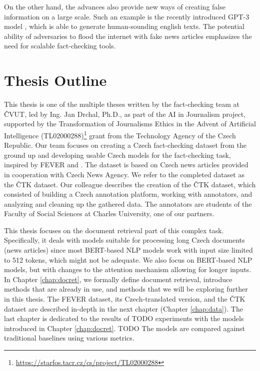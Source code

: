 On the other hand, the advances also provide new ways of creating false information on a large scale. Such an example is the recently introduced GPT-3 model \citep{gpt}, which is able to generate human-sounding english texts.
The potential ability of adversaries to flood the internet with fake news articles emphasizes the need for scalable fact-checking tools.

\section*{Thesis Outline}

This thesis is one of the multiple theses written by the fact-checking team at ČVUT, led by Ing. Jan Drchal, Ph.D., as part of the AI in Journalism project, supported by the Transformation of Journalisms Ethics in the Advent of Artificial Intelligence (TL02000288)\footnote{\url{https://starfos.tacr.cz/cs/project/TL02000288}} grant from the Technology Agency of the Czech Republic.
Our team focuses on creating a Czech fact-checking dataset from the ground up and developing usable Czech models for the fact-checking task, inspired by FEVER and \citet{danish_fever}.
The dataset is based on Czech news articles provided in cooperation with Czech News Agency.
We refer to the completed dataset as the ČTK dataset. 
Our colleague \citet{ullrich} describes the creation of the ČTK dataset, which consisted of building a Czech annotation platform, working with annotators, and analyzing and cleaning up the gathered data.
The annotators are students of the Faculty of Social Sciences at Charles University, one of our partners.

This thesis focuses on the document retrieval part of this complex task.
Specifically, it deals with models suitable for processing long Czech documents (news articles) since most BERT-based NLP models work with input size limited to 512 tokens, which might not be adequate.
We also focus on BERT-based NLP models, but with changes to the attention mechanism allowing for longer inputs.
In Chapter \ref{chap:docret}, we formally define document retrieval, introduce methods that are already in use, and methods that we will be exploring further in this thesis. 
The FEVER dataset, its Czech-translated version, and the ČTK dataset are described in-depth in the next chapter (Chapter \ref{chap:data}).
The last chapter is dedicated to the results of TODO experiments with the models introduced in Chapter \ref{chap:docret}.
TODO The models are compared against traditional baselines using various metrics.